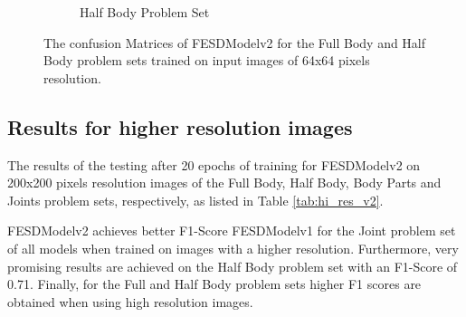 \begin{figure}[htbp]
\begin{subfigure}[b]{0.4\linewidth}
      \caption{Half Body Problem Set}
      \label{fig:hb_conf}
  \end{subfigure}
  \caption[Confusion Matrices of FESDModelv2 (64x64 pixels input resolution)]{The confusion Matrices of FESDModelv2 for the Full Body and Half Body problem sets trained on input images of 64x64 pixels resolution.}
  \label{fig:conf_v2}
\end{figure}

\FloatBarrier

%
%
%
%
%
%
%
%
%
%
%
%
%
%
%

\subsection{Results for higher resolution images}

The results of the testing after 20 epochs of training for FESDModelv2 on 200x200 pixels resolution images of the Full Body, Half Body, Body Parts and Joints problem sets, respectively, as listed in Table \ref{tab:hi_res_v2}.

\begin{center}    

\end{center}    

FESDModelv2 achieves better F1-Score FESDModelv1 for the Joint problem set of all models when trained on images with a higher resolution. Furthermore, very promising results are achieved on the Half Body problem set with an F1-Score of 0.71. Finally, for the Full and Half Body problem sets higher F1 scores are obtained when using high resolution images.

